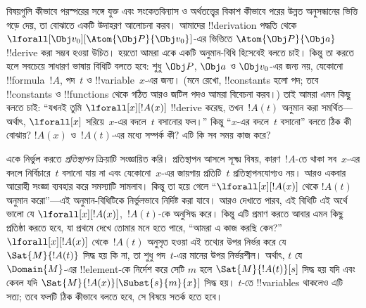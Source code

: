 \documentclass[../../../include/open-logic-section]{subfiles}
\begin{document}


বিষয়গুলি কীভাবে পরস্পরের সঙ্গে যুক্ত এবং সংকেতবিন্যাস ও অর্থতত্ত্বের
বিকাশ কীভাবে পরের উন্নত অনুসন্ধানের ভিত্তি গড়ে দেয়, তা বোঝাতে একটি
উদাহরণ আলোচনা করব। আমাদের !!{derivation} পদ্ধতি থেকে
$\lforall[\Obj v_0][\Atom{\Obj P}{\Obj v_0}]$-এর ভিত্তিতে
$\Atom{\Obj P}{\Obj a}$ !!{derive} করা সম্ভব হওয়া উচিত। হয়তো আমরা একে
একটি অনুমান-বিধি হিসেবেই বলতে চাই। কিন্তু তা করতে হলে সবচেয়ে সাধারণ
ভাষায় বিধিটি বলতে হবে: শুধু $\Obj P$, $\Obj a$ ও $\Obj v_0$-এর জন্য
নয়, যেকোনো !!{formula}~$!A$, পদ~$t$ ও !!{variable}~$x$-এর জন্য। (মনে
রেখো, !!{constant}s হলো পদ; তবে !!{constant}s ও !!{function}s থেকে গঠিত
আরও জটিল পদও আমরা বিবেচনা করব।) তাই আমরা এমন কিছু বলতে চাই: “যখনই তুমি
$\lforall[x][!A(x)]$ !!{derive} করেছ, তখন~$!A(t)$ অনুমান করা সমর্থিত—অর্থাৎ,
$\lforall[x]$ সরিয়ে~$x$-এর বদলে~$t$ বসানোর ফল।” কিন্তু “$x$-এর বদলে~$t$
বসানো” বলতে ঠিক কী বোঝায়? $!A(x)$ ও~$!A(t)$-এর মধ্যে সম্পর্ক কী? এটি
কি সব সময় কাজ করে?

একে নির্ভুল করতে \emph{প্রতিস্থাপন} ক্রিয়াটি সংজ্ঞায়িত করি। প্রতিস্থাপন
আসলে সূক্ষ্ম বিষয়, কারণ~$!A$-তে থাকা সব~$x$-এর বদলে নির্বিচারে~$t$ বসানো
যায় না এবং যেকোনো~$x$-এর জায়গায় প্রতিটি~$t$ প্রতিস্থাপনযোগ্যও নয়।
আরও একবার আরোহী সংজ্ঞা ব্যবহার করে সমস্যাটি সামলাব। কিন্তু তা হয়ে গেলে
“$\lforall[x][!A(x)]$ থেকে $!A(t)$ অনুমান করো”—এই অনুমান-বিধিটিকে
নির্ভুলভাবে নির্দিষ্ট করা যাবে। আরও দেখাতে পারব, এই বিধিটি এই অর্থে ভালো
যে $\lforall[x][!A(x)]$,~$!A(t)$-কে অনুসিদ্ধ করে। কিন্তু এটি প্রমাণ করতে
আবার এমন কিছু প্রতিষ্ঠা করতে হবে, যা প্রথমে দেখে তোমার মনে হতে পারে,
“আমরা এ কাজ করছি কেন?” $\lforall[x][!A(x)]$ থেকে~$!A(t)$ অনুসৃত হওয়া
এই তথ্যের উপর নির্ভর করে যে $\Sat{M}{!A(t)}$ সিদ্ধ হয় কি না, তা শুধু
পদ~$t$-এর মানের উপর নির্ভরশীল। অর্থাৎ, $t$ যে~$\Domain{M}$-এর
!!{element}-কে নির্দেশ করে সেটি $m$ হলে $\Sat{M}{!A(t)}[s]$ সিদ্ধ হয়
যদি এবং কেবল যদি $\Sat{M}{!A(x)}[\Subst{s}{m}{x}]$ সিদ্ধ হয়। $t$-তে
!!{variable}s থাকলেও এটি সত্য; তবে ফলটি ঠিক কীভাবে বলতে হবে, সে বিষয়ে
সতর্ক হতে হবে।
\end{document}
